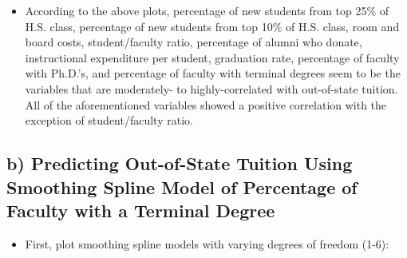 \documentclass[
]{article}
\providecommand{\tightlist}{%
  \setlength{\itemsep}{0pt}\setlength{\parskip}{0pt}}
\begin{document}
\begin{itemize}
\tightlist
\item
  According to the above plots, percentage of new students from top 25\%
  of H.S. class, percentage of new students from top 10\% of H.S. class,
  room and board costs, student/faculty ratio, percentage of alumni who
  donate, instructional expenditure per student, graduation rate,
  percentage of faculty with Ph.D.'s, and percentage of faculty with
  terminal degrees seem to be the variables that are moderately- to
  highly-correlated with out-of-state tuition. All of the aforementioned
  variables showed a positive correlation with the exception of
  student/faculty ratio.
\end{itemize}

\hypertarget{b-predicting-out-of-state-tuition-using-smoothing-spline-model-of-percentage-of-faculty-with-a-terminal-degree}{%
\subsection{\texorpdfstring{\textbf{b) Predicting Out-of-State Tuition
Using Smoothing Spline Model of Percentage of Faculty with a Terminal
Degree}}{b) Predicting Out-of-State Tuition Using Smoothing Spline Model of Percentage of Faculty with a Terminal Degree}}\label{b-predicting-out-of-state-tuition-using-smoothing-spline-model-of-percentage-of-faculty-with-a-terminal-degree}}

\begin{itemize}
\tightlist
\item
  First, plot smoothing spline models with varying degrees of freedom
  (1-6):
\end{itemize}
\end{document}
